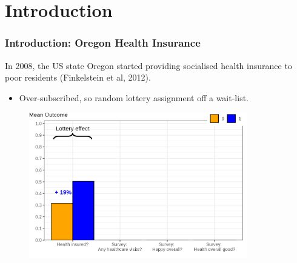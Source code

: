 \documentclass[dvipsnames]{beamer} %
\begin{document}
\section{Introduction}
\begin{frame}
    \frametitle{Introduction: Oregon Health Insurance}
    In 2008, the US state Oregon started providing socialised health insurance to poor residents (Finkelstein et al, 2012).
    \begin{itemize}
        \item Over-subscribed, so random lottery assignment off a wait-list.
    \end{itemize}
    \vspace{-0.5cm}
    \begin{figure}
        \centering
        \singlespacing
        \includegraphics[width=0.85\textwidth]{
            presentation-files/figures/lottery-effects.png}
            
    \end{figure}
\end{frame}
\end{document}
